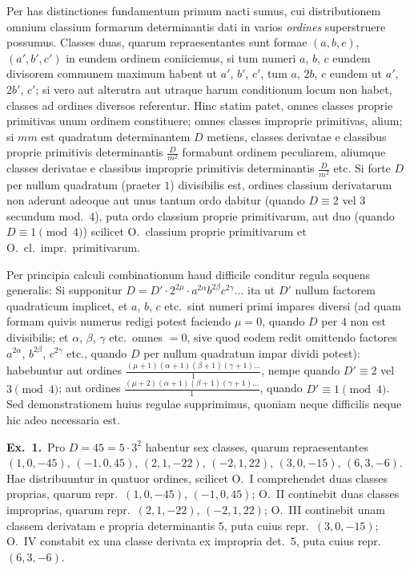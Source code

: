\documentclass[12pt,a4paper]{article}
\theoremstyle{plain}
\theoremstyle{definition}
\theoremstyle{remark}
\begin{document}
Per has distinctiones fundamentum primum nacti sumus, cui distributionem omnium classium formarum determinantis dati in varios \emph{ordines} superstruere possumus. Classes duas, quarum repraesentantes sunt formae $(a,b,c)$, $(a',b',c')$ in eundem ordinem coniiciemus, si tum numeri $a$, $b$, $c$ eundem divisorem communem maximum habent ut $a'$, $b'$, $c'$, tum $a$, $2b$, $c$ eundem ut $a'$, $2b'$, $c'$; si vero aut alterutra aut utraque harum conditionum locum non habet, classes ad ordines diversos referentur. Hinc statim patet, omnes classes proprie primitivas unum ordinem constituere; omnes classes improprie primitivas, alium; si $mm$ est quadratum determinantem $D$ metiens, classes derivatae e classibus proprie primitivis determinantis $\frac{D}{m^2}$ formabunt ordinem peculiarem, aliumque classes derivatae e classibus improprie primitivis determinantis $\frac{D}{m^2}$ etc. Si forte $D$ per nullum quadratum (praeter $1$) divisibilis est, ordines classium derivatarum non aderunt adeoque aut unus tantum ordo dabitur (quando $D\equiv 2$ vel $3$ secundum mod.\ $4$), puta ordo classium proprie primitivarum, aut duo (quando $D\equiv 1\pmod{4}$) scilicet O.\ classium proprie primitivarum et O.\ cl.\ impr.\ primitivarum.

Per principia calculi combinationum haud difficile conditur regula sequens generalis: Si supponitur $D=D'\cdot 2^{2\mu}\cdot a^{2\alpha}b^{2\beta}c^{2\gamma}\ldots$ ita ut $D'$ nullum factorem quadraticum implicet, et $a$, $b$, $c$ etc.\ sint numeri primi impares diversi (ad quam formam quivis numerus redigi potest faciendo $\mu=0$, quando $D$ per $4$ non est divisibilis; et $\alpha$, $\beta$, $\gamma$ etc.\ omnes $=0$, sive quod eodem redit omittendo factores $a^{2\alpha}$, $b^{2\beta}$, $c^{2\gamma}$ etc., quando $D$ per nullum quadratum impar dividi potest): habebuntur aut ordines $\frac{(\mu+1)(\alpha+1)(\beta+1)(\gamma+1)\ldots}{1}$, nempe quando $D'\equiv 2$ vel $3\pmod{4}$; aut ordines $\frac{(\mu+2)(\alpha+1)(\beta+1)(\gamma+1)\ldots}{1}$, quando $D'\equiv 1\pmod{4}$. Sed demonstrationem huius regulae supprimimus, quoniam neque difficilis neque hic adeo necessaria est.

\textbf{Ex.\ 1.}\ Pro $D=45=5\cdot 3^2$ habentur sex classes, quarum repraesentantes $(1,0,-45)$, $(-1,0,45)$, $(2,1,-22)$, $(-2,1,22)$, $(3,0,-15)$, $(6,3,-6)$. Hae distribuuntur in quatuor ordines, scilicet O.\ I comprehendet duas classes proprias, quarum repr.\ $(1,0,-45)$, $(-1,0,45)$; O.\ II continebit duas classes improprias, quarum repr.\ $(2,1,-22)$, $(-2,1,22)$; O.\ III continebit unam classem derivatam e propria determinantis $5$, puta cuius repr.\ $(3,0,-15)$; O.\ IV constabit ex una classe derivata ex impropria det.\ $5$, puta cuius repr.\ $(6,3,-6)$.
\end{document}
